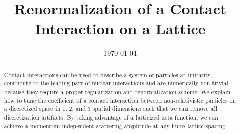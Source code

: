 \documentclass[aps,superscriptaddress,tightenlines,nofootinbib,floatfix,longbibliography,notitlepage,10pt,pra]{revtex4-1}
\begin{document}
\title{Renormalization of a Contact Interaction on a Lattice}





\date{\today}

\begin{abstract}
Contact interactions can be used to describe a system of particles at unitarity, contribute to the leading part of nuclear interactions and are numerically non-trivial because they require a proper regularization and renormalization scheme.
We explain how to tune the coefficient of a contact interaction between non-relativistic particles on a discretized space in 1, 2, and 3 spatial dimensions such that we can remove all discretization artifacts.
By taking advantage of a latticized \Luscher zeta function, we can achieve a momentum-independent scattering amplitude at any finite lattice spacing.
\end{abstract}

\maketitle





   
       \FloatBarrier
      \FloatBarrier
% 



\appendix







\end{document}
